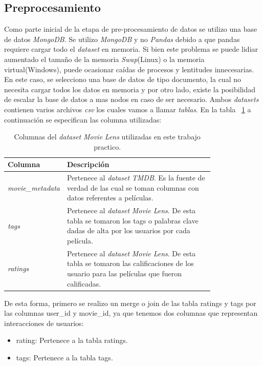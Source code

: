 \documentclass[11pt,a4paper,twoside]{thesis}
\begin{document}
\clearpage

\subsection{Preprocesamiento}

Como parte inicial de la etapa de pre-procesamiento de datos se utilizo una base de datos \textit{MongoDB}. Se utilizo \textit{MongoDB} y no \textit{Pandas} debido a que pandas requiere cargar todo el \textit{dataset} en memoria. Si bien este problema se puede lidiar aumentado el tamaño de la memoria \textit{Swap}(Linux) o la memoria virtual(Windows), puede ocasionar caídas de procesos y lentitudes innecesarias. En este caso, se selecciono una base de datos de tipo documento, la cual no necesita cargar todos los datos en memoria y por otro lado, existe la posibilidad de escalar la base de datos a mas nodos en caso de ser necesario.
Ambos \textit{datasets} contienen varios archivos \textit{csv} los cuales vamos a llamar \textit{tablas}. En la tabla ~\ref{table:tableRatings} a continuación se especifican las columna utilizadas:

\begin{table}[!htb]
	\centering
	\footnotesize
	\begin{tabular}{l | p{0.8\linewidth}}
	\hline
		Columna              & Descripción \\
	\hline
	\textit{movie\_metadata} & Pertenece al \textit{dataset} \textit{TMDB}. Es la fuente de verdad de las cual se toman columnas con datos referentes a películas. \\
	\textit{tags}            & Pertenece al \textit{dataset} \textit{Movie Lens}. De esta tabla se tomaron los tags o palabras clave dadas de alta por los usuarios por cada película. \\
	\textit{ratings}         & Pertenece al \textit{dataset} \textit{Movie Lens}. De esta tabla se tomaron las calificaciones de los usuario para las películas que fueron calificadas. \\
	\hline
	\end{tabular}
	\caption{
		Columnas del \textit{dataset} \textit{Movie Lens} utilizadas en este trabajo practico.
	}
	\label{table:tableRatings}
\end{table}


De esta forma, primero se realizo un merge o join de las tabla ratings y tags por las columnas user\_id y movie\_id,
 ya que tenemos dos columnas que representan interacciones de usuarios: 

\begin{itemize}
	\item rating: Pertenece a la tabla ratings.
	\item tags: Pertenece a la tabla tags.
\end{itemize}
\end{document}
